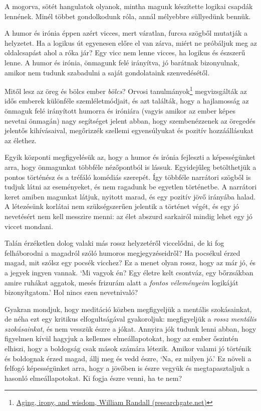 \noindent A mogorva, sötét hangulatok olyanok, mintha magunk készítette
logikai csapdák lennének. Minél többet gondolkodunk róla, annál
mélyebbre süllyedünk bennük.

A humor és irónia éppen azért vicces, mert váratlan, furcsa szögből
mutatják a helyzetet. Ha a logikus út egyenesen előre el van zárva,
miért ne próbáljuk meg az oldalcsapást ahol a róka jár? Egy vicc nem
lenne vicces, ha logikus és észszerű lenne. A humor és irónia, önmagunk
felé irányítva, jó barátnak bizonyulnak, amikor nem tudunk szabadulni a
saját gondolataink szenvedésétől.

Mitől lesz az öreg és bölcs ember \emph{bölcs}? Orvosi
tanulmányok\footnote{\href{https://www.researchgate.net/publication/258190619_Aging_irony_and_wisdom_On_the_narrative_psychology_of_later_life}{Aging,
  irony, and wisdom, William Randall (researchgate.net)}} megvizsgálták
az idős emberek különféle szemléletmódjait, és azt találták, hogy a
hajlamosság az önmaguk felé irányított humorra és iróniára (vagyis
amikor az ember képes nevetni önmagán) nagy segítséget jelent abban,
hogy szembenézzenek az öregedés jelentős kihívásaival, megőrizzék
szellemi egyensúlyukat és pozitív hozzáállásukat az élethez.

Egyik központi megfigyelésük az, hogy a humor és irónia fejleszti a
képességünket arra, hogy önmagunkat többféle nézőpontból is lássuk.
Egyidejűleg betölthetjük a pontos történész és a tréfáló komédiás
szerepét. Így többféle narrátori szögből is tudjuk látni az eseményeket,
és nem ragadunk be egyetlen történetbe. A narrátori keret amiben
magunkat látjuk, nyitott marad, és egy pozitív jövő irányába halad. A
létezésünk korlátai nem szükségszerűen jelentik a történet végét, és egy
jó nevetésért nem kell messzire menni: az élet abszurd sarkairól mindig
lehet egy jó viccet mondani.

Talán érzéketlen dolog valaki más rossz helyzetéről viccelődni, de ki
fog felháborodni a magadról szóló humoros megjegyzéseidről? Ha pocsékul
érzed magad, mit szólsz egy pocsék vicchez? Ez a menet olyan rossz, hogy
az már jó, és a jegyek ingyen vannak. `Mi vagyok én? Egy életre kelt
csontváz, egy bőrzsákban amire ruhákat aggatok, mesés frizurám alatt a
\emph{fontos véleményeim} logikáját bizonyítgatom.' Hol nincs ezen
nevetnivaló?

Gyakran mondjuk, hogy meditáció közben megfigyeljük a mentális
szokásainkat, de néha ezt egy kritikus elfogultságával gyakoroljuk:
megfigyeljük a \emph{rossz mentális szokásainkat}, és nem vesszük észre
a jókat. Annyira jók tudunk lenni abban, hogy figyelmen kívül hagyjuk a
kellemes elmeállapotokat, hogy az ember őszintén elhiszi, hogy a
boldogság csak mások számára létezik. Amikor valami jó történik és
boldognak érzed magad, állj meg és vedd észre, `Na, ez milyen jó.' Ez
növeli a felfogó képességünket arra, hogy a jövőben is észre vegyük és
megtapasztaljuk a hasonló elmeállapotokat. Ki fogja észre venni, ha te
nem?

